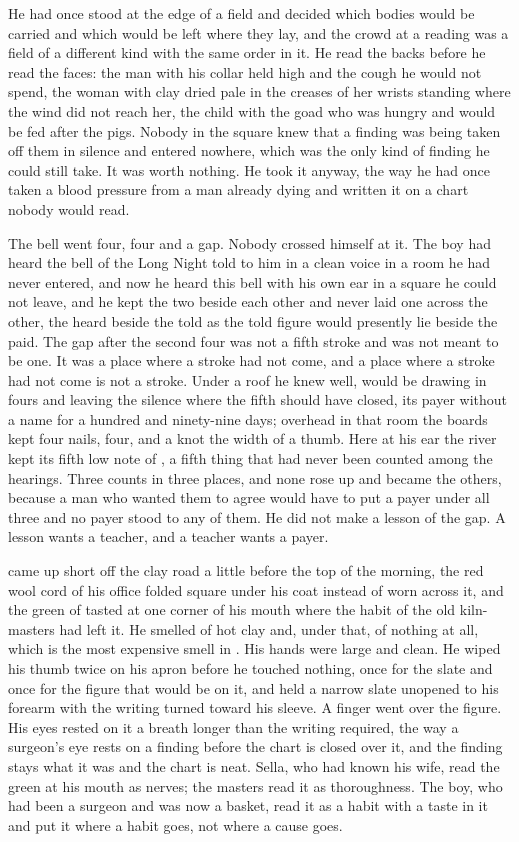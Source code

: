 He had once stood at the edge of a field and decided which bodies would be carried and which would be left where they lay, and the crowd at a reading was a field of a different kind with the same order in it. He read the backs before he read the faces: the man with his collar held high and the cough he would not spend, the woman with clay dried pale in the creases of her wrists standing where the wind did not reach her, the child with the goad who was hungry and would be fed after the pigs. Nobody in the square knew that a finding was being taken off them in silence and entered nowhere, which was the only kind of finding he could still take. It was worth nothing. He took it anyway, the way he had once taken a blood pressure from a man already dying and written it on a chart nobody would read.

The bell went four, four and a gap. Nobody crossed himself at it. The boy had heard the bell of the Long Night told to him in a clean voice in a room he had never entered, and now he heard this bell with his own ear in a square he could not leave, and he kept the two beside each other and never laid one across the other, the heard beside the told as the told figure would presently lie beside the paid. The gap after the second four was not a fifth stroke and was not meant to be one. It was a place where a stroke had not come, and a place where a stroke had not come is not a stroke. Under a roof he knew well,  would be drawing in fours and leaving the silence where the fifth should have closed, its payer without a name for a hundred and ninety-nine days; overhead in that room the boards kept four nails, four, and a knot the width of a thumb. Here at his ear the river kept its fifth low note of , a fifth thing that had never been counted among the hearings. Three counts in three places, and none rose up and became the others, because a man who wanted them to agree would have to put a payer under all three and no payer stood to any of them. He did not make a lesson of the gap. A lesson wants a teacher, and a teacher wants a payer.

 came up short off the clay road a little before the top of the morning, the red wool cord of his office folded square under his coat instead of worn across it, and the green of tasted  at one corner of his mouth where the habit of the old kiln-masters had left it. He smelled of hot clay and, under that, of nothing at all, which is the most expensive smell in . His hands were large and clean. He wiped his thumb twice on his apron before he touched nothing, once for the slate and once for the figure that would be on it, and held a narrow slate unopened to his forearm with the writing turned toward his sleeve. A finger went over the figure. His eyes rested on it a breath longer than the writing required, the way a surgeon's eye rests on a finding before the chart is closed over it, and the finding stays what it was and the chart is neat. Sella, who had known his wife, read the green at his mouth as nerves; the masters read it as thoroughness. The boy, who had been a surgeon and was now a basket, read it as a habit with a taste in it and put it where a habit goes, not where a cause goes.

